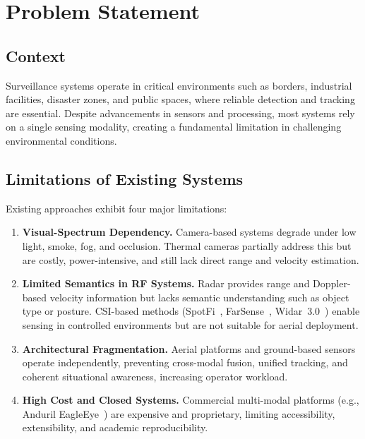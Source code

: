 \chapter{Problem Statement}
\label{Problem_Statement}

\section{Context}
Surveillance systems operate in critical environments such as borders, industrial facilities, disaster zones, and public spaces, where reliable detection and tracking are essential. Despite advancements in sensors and processing, most systems rely on a single sensing modality, creating a fundamental limitation in challenging environmental conditions.

\section{Limitations of Existing Systems}

Existing approaches exhibit four major limitations:

\begin{enumerate}[label=\textbf{L\arabic*.}]

\item \textbf{Visual-Spectrum Dependency.}  
Camera-based systems degrade under low light, smoke, fog, and occlusion. Thermal cameras partially address this but are costly, power-intensive, and still lack direct range and velocity estimation.

\item \textbf{Limited Semantics in RF Systems.}  
Radar provides range and Doppler-based velocity information but lacks semantic understanding such as object type or posture. CSI-based methods (SpotFi~\cite{kotaru2015spotfi}, FarSense~\cite{zhang2019farsense}, Widar~3.0~\cite{zheng2019zero}) enable sensing in controlled environments but are not suitable for aerial deployment.

\item \textbf{Architectural Fragmentation.}  
Aerial platforms and ground-based sensors operate independently, preventing cross-modal fusion, unified tracking, and coherent situational awareness, increasing operator workload.

\item \textbf{High Cost and Closed Systems.}  
Commercial multi-modal platforms (e.g., Anduril EagleEye~\cite{anduril_eagleeye}) are expensive and proprietary, limiting accessibility, extensibility, and academic reproducibility.

\end{enumerate}

